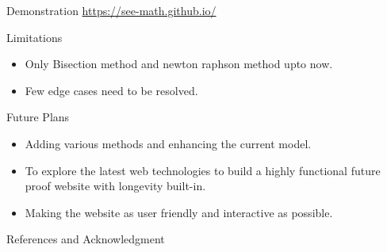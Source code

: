 \documentclass[12pt]{beamer}
\begin{document}
	
	\begin{frame}{Demonstration}
		\url{https://see-math.github.io/}
	\end{frame}

	
		\begin{frame}{Limitations}
		\begin{itemize}
			
			\item {Only  Bisection method and newton raphson method upto now.}
			
			\item {Few edge cases need to be resolved.}
			
			
			
		\end{itemize}
		
	\end{frame}
	\begin{frame}{Future Plans}
\begin{itemize}
	
	\item {Adding various methods and enhancing the current model.}
	
	\item {To explore the latest web technologies to build a highly functional future proof website with longevity built-in.}
	
	\item {Making the website as user friendly and interactive as possible.}
	
\end{itemize}
	\end{frame}

	\begin{frame}{References and Acknowledgment}

		
\end{frame}
	
\end{document}
